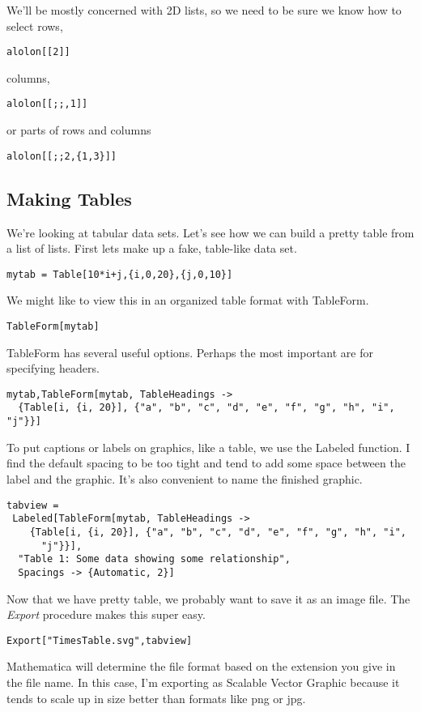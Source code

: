 \documentclass[]{tufte-handout}
\begin{document}
We'll be mostly concerned with 2D lists, so we need to be sure we know how to select rows,
\begin{verbatim}
alolon[[2]]
\end{verbatim}
columns,
\begin{verbatim}
alolon[[;;,1]]
\end{verbatim}
or parts of rows and columns
\begin{verbatim}
alolon[[;;2,{1,3}]]	
\end{verbatim}



\subsection{Making Tables}

We're looking at tabular data sets. Let's see how we can build a pretty table from a list of lists. First lets make up a fake, table-like data set. 
\begin{verbatim}
mytab = Table[10*i+j,{i,0,20},{j,0,10}]
\end{verbatim}

We might like to view this in an organized table format with TableForm. 
\begin{verbatim}
TableForm[mytab]
\end{verbatim}
TableForm has several useful options. Perhaps the most important are for specifying headers.
\begin{verbatim}
mytab,TableForm[mytab, TableHeadings ->
  {Table[i, {i, 20}], {"a", "b", "c", "d", "e", "f", "g", "h", "i", "j"}}]
\end{verbatim}

To put captions or labels on graphics, like a table, we use the Labeled function. I find the default spacing to be too tight and tend to add some space between the label and the graphic. It's also convenient to name the finished graphic.
\begin{verbatim}
tabview = 
 Labeled[TableForm[mytab, TableHeadings ->
    {Table[i, {i, 20}], {"a", "b", "c", "d", "e", "f", "g", "h", "i", 
      "j"}}],
  "Table 1: Some data showing some relationship", 
  Spacings -> {Automatic, 2}]
\end{verbatim}

Now that we have pretty table, we probably want to save it as an image file. The \textit{Export} procedure makes this super easy. 
\begin{verbatim}
Export["TimesTable.svg",tabview]
\end{verbatim}
Mathematica will determine the file format based on the extension you give in the file name. In this case, I'm exporting as Scalable Vector Graphic because it tends to scale up in size better than formats like png or jpg. 
\end{document}
